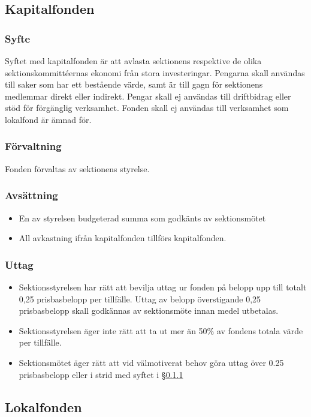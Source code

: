 \documentclass[a4paper, 10pt]{article}
\begin{document}
\subsection{Kapitalfonden}
\subsubsection{Syfte}
\label{sec:kapitalfond_syfte}
Syftet med kapitalfonden är att avlasta sektionens respektive de olika sektionskommittéernas ekonomi från stora investeringar. Pengarna skall användas till saker som har ett bestående värde, samt är till gagn för sektionens medlemmar direkt eller indirekt. Pengar skall ej användas till driftbidrag eller stöd för förgänglig verksamhet. Fonden skall ej användas till verksamhet som lokalfond är ämnad för.
\subsubsection{Förvaltning}
Fonden förvaltas av sektionens styrelse.
\subsubsection{Avsättning}
\begin{itemize}
\item En av styrelsen budgeterad summa som godkänts av sektionsmötet
\item All avkastning ifrån kapitalfonden tillförs kapitalfonden.
\end{itemize}
\subsubsection{Uttag}
\begin{itemize}
\item Sektionsstyrelsen har rätt att bevilja uttag ur fonden på belopp upp till totalt 0,25 prisbasbelopp per tillfälle. Uttag av belopp överstigande 0,25 prisbasbelopp skall godkännas av sektionsmöte innan medel utbetalas.
\item Sektionsstyrelsen äger inte rätt att ta ut mer än 50\% av fondens totala värde per tillfälle.
\item Sektionsmötet äger rätt att vid välmotiverat behov göra uttag över 0.25 prisbasbelopp eller i strid med syftet i \S\ref{sec:kapitalfond_syfte}
\end{itemize}

\subsection{Lokalfonden}
\end{document}
